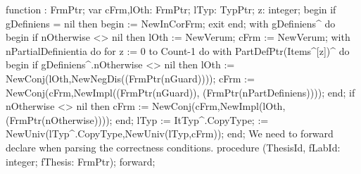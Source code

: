 \nwenddocs{}\endmoddef\nwstartdeflinemarkup{}\nwenddeflinemarkup
function : FrmPtr;
var
   cFrm,lOth: FrmPtr;
   lTyp: TypPtr;
   z: integer;
begin
   if gDefiniens = nil then begin  := NewInCorFrm; exit end;
   with gDefiniens^ do
   begin
      if nOtherwise <> nil then lOth := NewVerum;
      cFrm := NewVerum;
      with nPartialDefinientia do
         for z := 0 to Count-1 do 
            with PartDefPtr(Items^[z])^ do
         begin
            if gDefiniens^.nOtherwise <> nil then
               lOth := NewConj(lOth,NewNegDis((FrmPtr(nGuard))));
            cFrm := NewConj(cFrm,NewImpl((FrmPtr(nGuard)),
                                         (FrmPtr(nPartDefiniens))));
         end;
      if nOtherwise <> nil then
         cFrm := NewConj(cFrm,NewImpl(lOth,(FrmPtr(nOtherwise))));
   end;
   lTyp := ItTyp^.CopyType;
    := NewUniv(lTyp^.CopyType,NewUniv(lTyp,cFrm));
end;
\eatline
{}\nwendcode{}\nwdocspar
We need to forward declare {\Tt{}\nwendquote} when parsing the correctness conditions.
\nwenddocs{}\endmoddef\nwstartdeflinemarkup\nwenddeflinemarkup
procedure (ThesisId, fLabId: integer; fThesis: FrmPtr); forward;


